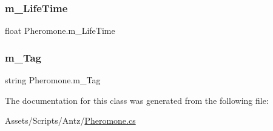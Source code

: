 \subsubsection{\texorpdfstring{m\_LifeTime}{m\_LifeTime}}
{\footnotesize\ttfamily float Pheromone.\+m\+\_\+\+Life\+Time}

\mbox{\label{class_pheromone_a340a83641b17cda871cdcc0a89855e84}} 
\subsubsection{\texorpdfstring{m\_Tag}{m\_Tag}}
{\footnotesize\ttfamily string Pheromone.\+m\+\_\+\+Tag}



The documentation for this class was generated from the following file\+:\begin{DoxyCompactItemize}
\item 
Assets/\+Scripts/\+Antz/\mbox{\hyperlink{_pheromone_8cs}{Pheromone.\+cs}}\end{DoxyCompactItemize}
